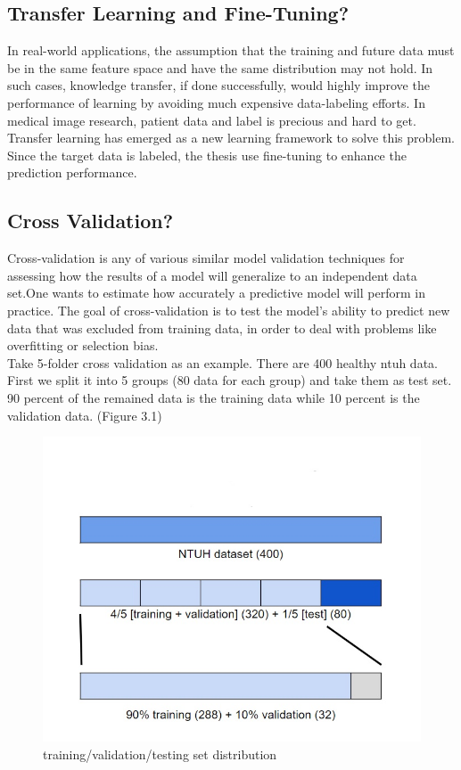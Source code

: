 \subsection{Transfer Learning and Fine-Tuning?}
In real-world applications, the assumption that the training and future data must be in the same feature space and have the same distribution may not hold. In such cases, knowledge transfer, if done successfully, would highly improve the performance of learning by avoiding much expensive data-labeling efforts. In medical image research, patient data and label is precious and hard to get. Transfer learning has emerged as a new learning framework to solve this problem. Since the target data is labeled, the thesis use fine-tuning to enhance the prediction performance.\cite{pan2009survey}

\subsection{Cross Validation?}
Cross-validation is any of various similar model validation techniques for assessing how the results of a model will generalize to an independent data set.One wants to estimate how accurately a predictive model will perform in practice. The goal of cross-validation is to test the model's ability to predict new data that was excluded from training data, in order to deal with problems like overfitting or selection bias.
\\
Take 5-folder cross validation as an example. There are 400 healthy ntuh data. First we split it into 5 groups (80 data for each group) and take them as test set. 90 percent of the remained data is the training data while 10 percent is the validation data. (Figure 3.1)

\begin{figure}[H]
    \hfil
    \begin{minipage}[t]{0.9\textwidth}
        \includegraphics[width=\textwidth]{fig/cross.png}
        \caption{\label{fig:parallel1} training/validation/testing set distribution}
    \end{minipage}
    \hfil
\end{figure}


